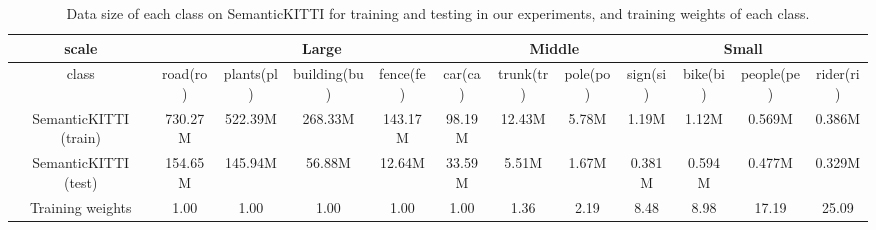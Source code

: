 \documentclass[journal]{IEEEtran}
\begin{document}

%

\begin{table*}[b]
	\centering
	\renewcommand{\arraystretch}{1.3}
	\caption{Data size of each class on SemanticKITTI for training and testing in our experiments, and training weights of each class.}
	\begin{tabular}{c|ccccc|cc|cc|cc}
		\hline
		scale & \multicolumn{5}{c|}{Large}    & \multicolumn{2}{c|}{Middle}    & \multicolumn{4}{c}{Small}    \\ \hline
		class & road(ro)    & plants(pl)    & building(bu)    & fence(fe)   & car(ca)    & trunk(tr)  & pole(po) & sign(si) &  bike(bi) & people(pe) & rider(ri)\\ \hline	
		SemanticKITTI (train) & 730.27M & 522.39M & 268.33M & 143.17M & 98.19M & 12.43M & 5.78M & 1.19M & 1.12M & 0.569M & 0.386M  \\
		SemanticKITTI (test) & 154.65M & 145.94M & 56.88M & 12.64M & 33.59M & 5.51M & 1.67M & 0.381M & 0.594M & 0.477M & 0.329M  \\ \hline
		Training weights & 1.00 & 1.00 & 1.00 & 1.00 & 1.00 & 1.36 & 2.19 & 8.48 & 8.98 & 17.19 & 25.09 \\
		\hline
	\end{tabular}	
	\label{tab:dataset}
	\vspace{-3mm}
\end{table*}
\end{document}

